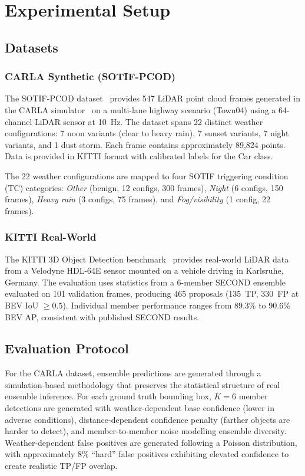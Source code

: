 \documentclass[conference]{IEEEtran}
\begin{document}

\section{Experimental Setup}

\subsection{Datasets}

\subsubsection{CARLA Synthetic (SOTIF-PCOD)}
The SOTIF-PCOD dataset~\cite{sotifpcod} provides 547 LiDAR point cloud frames generated in the CARLA simulator~\cite{dosovitskiy2017} on a multi-lane highway scenario (Town04) using a 64-channel LiDAR sensor at 10~Hz. The dataset spans 22 distinct weather configurations: 7 noon variants (clear to heavy rain), 7 sunset variants, 7 night variants, and 1 dust storm. Each frame contains approximately 89,824 points. Data is provided in KITTI format with calibrated labels for the Car class.

The 22 weather configurations are mapped to four SOTIF triggering condition (TC) categories: \emph{Other} (benign, 12 configs, 300 frames), \emph{Night} (6 configs, 150 frames), \emph{Heavy rain} (3 configs, 75 frames), and \emph{Fog/visibility} (1 config, 22 frames).

\subsubsection{KITTI Real-World}
The KITTI 3D Object Detection benchmark~\cite{geiger2012} provides real-world LiDAR data from a Velodyne HDL-64E sensor mounted on a vehicle driving in Karlsruhe, Germany. The evaluation uses statistics from a 6-member SECOND ensemble evaluated on 101 validation frames, producing 465 proposals (135~TP, 330~FP at BEV IoU $\geq 0.5$). Individual member performance ranges from 89.3\% to 90.6\% BEV AP, consistent with published SECOND results.

\subsection{Evaluation Protocol}

For the CARLA dataset, ensemble predictions are generated through a simulation-based methodology that preserves the statistical structure of real ensemble inference. For each ground truth bounding box, $K{=}6$ member detections are generated with weather-dependent base confidence (lower in adverse conditions), distance-dependent confidence penalty (farther objects are harder to detect), and member-to-member noise modelling ensemble diversity. Weather-dependent false positives are generated following a Poisson distribution, with approximately 8\% ``hard'' false positives exhibiting elevated confidence to create realistic TP/FP overlap.
\end{document}

